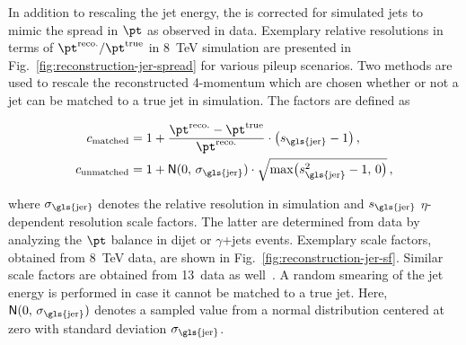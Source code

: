 In addition to rescaling the jet energy, the  is corrected for simulated jets to mimic the spread in $\pt$ as observed in data. Exemplary relative resolutions in terms of $\pt^\mathrm{reco.}/\pt^\mathrm{true}$ in 8~TeV simulation are presented in Fig.~\ref{fig:reconstruction-jer-spread} for various pileup scenarios. Two methods are used to rescale the reconstructed 4-momentum which are chosen whether or not a jet can be matched to a true jet in simulation. The factors are defined as

\begin{subequations}
\begin{align}
c_\mathrm{matched}&=1+\frac{\pt^\mathrm{reco.}-\pt^\mathrm{true}}{\pt^\mathrm{reco.}}\cdot\big(s_\mathrm{\gls{jer}}-1\big)\,,\\ c_\mathrm{unmatched}&=1+\mathsf{N}(0,\,\sigma_\mathrm{\gls{jer}})\cdot\sqrt{\mathrm{max}\big(s_\mathrm{\gls{jer}}^2-1,\,0\big)}\,,
\end{align}
\end{subequations}

where $\sigma_\mathrm{\gls{jer}}$ denotes the relative resolution in simulation and  $s_\mathrm{\gls{jer}}$ $\eta$-dependent resolution scale factors. The latter are determined from data by analyzing the $\pt$ balance in dijet or \mbox{$\gamma$+jets} events. Exemplary scale factors, obtained from 8~TeV data, are shown in Fig.~\ref{fig:reconstruction-jer-sf}. Similar scale factors are obtained from 13~\TeV data as well~\cite{CMS-DP-2016-020}. A random smearing of the jet energy is performed in case it cannot be matched to a true jet. Here, $\mathsf{N}(0,\,\sigma_\mathrm{\gls{jer}})$ denotes a sampled value from a normal distribution centered at zero with standard deviation $\sigma_\mathrm{\gls{jer}}$.

